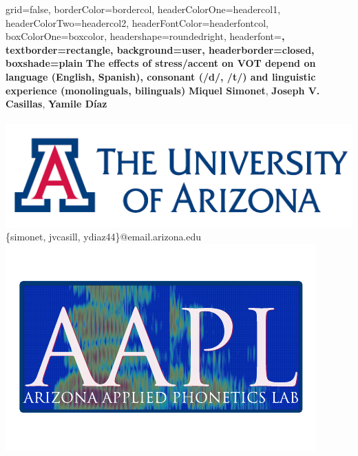 \documentclass[a0paper,portrait,columns=2]{baposter}
\begin{document}
\begin{poster}{
grid=false,
borderColor=bordercol, %
headerColorOne=headercol1, %
headerColorTwo=headercol2, %
headerFontColor=headerfontcol, %
boxColorOne=boxcolor, %
headershape=roundedright, %
headerfont=\Large\sf\bf, %
textborder=rectangle,
background=user,
headerborder=closed, %
boxshade=plain
}
{}
%
%
{\sf\bf \LARGE{The effects of stress/accent on VOT depend on language (English, Spanish), consonant (/d/, /t/) and linguistic experience (monolinguals, bilinguals)}}
{\vspace{.6em} \textbf{Miquel Simonet}, \textbf{Joseph V. Casillas}, \textbf{Yamile D\'iaz}\\ 
 \\
{\hspace{-7in}\includegraphics[scale=0.2]{UA_logo}\phantom{.}} \\
{\vspace{-.4in}\smaller \{simonet, jvcasill, ydiaz44\}@email.arizona.edu} \\
{\vspace{-.45in}\phantom{.}\hspace{7in}\includegraphics[scale=0.35]{aalp_logo}}\vspace{-.6in}}





\end{poster}
\end{document}
